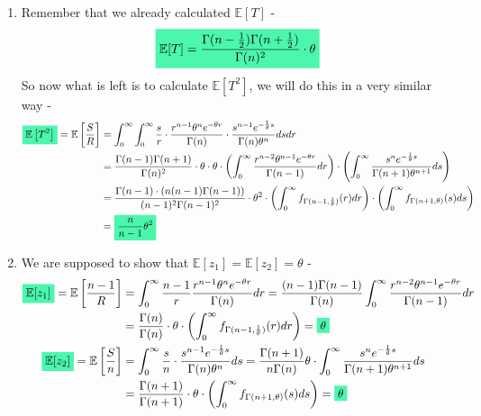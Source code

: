 \documentclass[../main.tex]{subfiles}
\begin{document}
\begin{enumerate}
    \item Remember that we already calculated $\mathbb{E}[T]$ - 
        \[\mathcolorbox{goodcolor}{\mathbb{E}[T] = \frac{\Gamma(n-\frac{1}{2})\Gamma(n+\frac{1}{2})}{\Gamma(n)^2}\cdot \theta}\]
    So now what is left is to calculate $\mathbb{E}\left[T^2\right]$, we will do this in a very similar way - 
        \begin{align*}
        \mathcolorbox{goodcolor}{\mathbb{E}\left[T^2\right]} = \mathbb{E}\left[\frac{S}{R}\right] &= \int_0^{\infty}\int_0^{\infty} \frac{s}{r} \cdot\frac{r^{n-1}\theta^n e^{-\theta r}}{\Gamma(n)}\cdot \frac{s^{n-1}e^{-\frac{1}{\theta} s}}{\Gamma(n)\theta^n}dsdr \\
        &= \frac{\Gamma(n-1)\Gamma(n+1)}{\Gamma(n)^2}\cdot\theta\cdot\theta\cdot\left(\int_0^\infty \frac{r^{n-2}\theta^{n-1} e^{-\theta r}}{\Gamma(n-1)}dr\right)\cdot \left(\int_0^\infty \frac{s^{n}e^{-\frac{1}{\theta} s}}{\Gamma(n+1)\theta^{n+1}}ds\right) \\
        &= \frac{\Gamma(n-1)\cdot\left(n(n-1)\Gamma(n-1)\right)}{(n-1)^2\Gamma(n-1)^2}\cdot\theta^2\cdot \left(\int_0^\infty f_{\Gamma(n-1, \frac{1}{\theta})}(r)dr \right)\cdot \left(\int_0^\infty f_{\Gamma(n+1,\theta)}(s)ds \right) \\ &= \mathcolorbox{goodcolor}{\frac{n}{n-1}\theta^2}
    \end{align*}    
    \item We are supposed to show that $\mathbb{E}[z_1]=\mathbb{E}[z_2]=\theta$ - 
    \begin{align*}
        \mathcolorbox{goodcolor}{\mathbb{E}[z_1]}=\mathbb{E}\left[\frac{n-1}{R}\right]&=\int_0^{\infty} \frac{n-1}{r} \frac{r^{n-1}\theta^n e^{-\theta r}}{\Gamma(n)} dr = \frac{(n-1)\Gamma(n-1)}{\Gamma(n)}\int_0^\infty \frac{r^{n-2} \theta^{n-1} e^{-\theta r}}{\Gamma(n-1)} dr\\&=\frac{\Gamma(n)}{\Gamma(n)}\cdot\theta\cdot\left(\int_0^\infty f_{\Gamma(n-1,\frac{1}{\theta})}(r) dr\right) = \mathcolorbox{goodcolor}{\theta}\\
        \mathcolorbox{goodcolor}{\mathbb{E}[z_2]} = \mathbb{E}\left[\frac{S}{n}\right] &= \int_0^\infty \frac{s}{n}\cdot\frac{s^{n-1}e^{-\frac{1}{\theta} s}}{\Gamma(n)\theta^n}ds = \frac{\Gamma(n+1)}{n\Gamma(n)}\theta\cdot\int_0^{\infty} \frac{s^n e^{-\frac{1}{\theta}s}}{\Gamma(n+1)\theta^{n+1}} ds\\&=\frac{\Gamma(n+1)}{\Gamma(n+1)}\cdot\theta\cdot\left(\int_0^\infty f_{\Gamma(n+1,\theta)}(s) ds\right) =\mathcolorbox{goodcolor}{\theta}
    \end{align*}

\end{enumerate}
\end{document}
